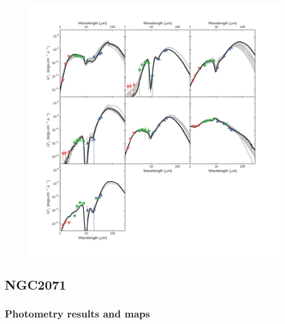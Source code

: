 \begin{figure}
\begin{center}
\includegraphics[width=1\textwidth]{Figures/IRAS20050_SEDs.png}
\label{fig:IRAS20050_SEDs}
\caption{}
\end{center}
\end{figure}




\subsection{NGC2071}


\subsubsection{Photometry results and maps}


